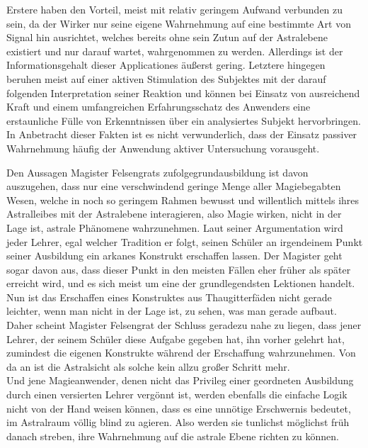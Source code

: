\documentclass[a5paper,8pt]{book}
\begin{document}
\begin{multicols}{2}
Erstere haben den Vorteil, meist mit relativ geringem Aufwand verbunden zu sein, da der Wirker nur seine eigene
Wahrnehmung auf eine bestimmte Art von Signal hin ausrichtet, welches bereits ohne sein Zutun auf der Astralebene
existiert und nur darauf wartet, wahrgenommen zu werden. Allerdings ist der Informationsgehalt dieser Applicationes
äußerst gering. Letztere hingegen beruhen meist auf einer aktiven Stimulation des Subjektes mit der darauf
folgenden Interpretation seiner Reaktion und können bei Einsatz von ausreichend Kraft und einem umfangreichen
Erfahrungsschatz des Anwenders eine erstaunliche Fülle von Erkenntnissen über ein analysiertes Subjekt hervorbringen. In Anbetracht dieser
Fakten ist es nicht verwunderlich, dass der Einsatz passiver Wahrnehmung häufig der Anwendung aktiver Untersuchung
vorausgeht.

Den Aussagen Magister Felsengrats zufolgegrundausbildung ist davon auszugehen, dass nur eine verschwindend geringe
Menge aller Magiebegabten Wesen, welche in noch so geringem Rahmen bewusst und willentlich mittels ihres Astralleibes
mit der Astralebene interagieren, also Magie wirken, nicht in der Lage ist, astrale Phänomene wahrzunehmen. Laut seiner
Argumentation wird jeder Lehrer, egal welcher Tradition er folgt, seinen Schüler an irgendeinem Punkt seiner Ausbildung
ein arkanes Konstrukt erschaffen lassen. Der Magister geht sogar davon aus, dass dieser Punkt in den meisten Fällen eher
früher als später erreicht wird, und es sich meist um eine der grundlegendsten Lektionen handelt. Nun ist das
Erschaffen eines Konstruktes aus Thaugitterfäden nicht gerade leichter, wenn man nicht in der Lage ist, zu sehen, was man gerade
aufbaut. Daher scheint Magister Felsengrat der Schluss geradezu nahe zu liegen, dass jener Lehrer, der seinem
Schüler diese Aufgabe gegeben hat, ihn vorher gelehrt hat, zumindest die eigenen Konstrukte während der Erschaffung
wahrzunehmen. Von da an ist die Astralsicht als solche kein allzu großer Schritt mehr.\\
Und jene Magieanwender, denen nicht das Privileg einer geordneten Ausbildung durch einen versierten Lehrer vergönnt ist,
werden ebenfalls die einfache Logik nicht von der Hand weisen können, dass es eine unnötige Erschwernis bedeutet, im
Astralraum völlig blind zu agieren. Also werden sie tunlichst möglichst früh danach streben, ihre Wahrnehmung auf
die astrale Ebene richten zu können.
\end{multicols}
\noindent\hrulefill
\end{document}
